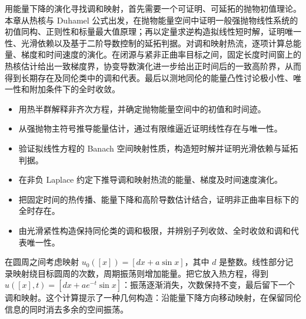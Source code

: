 
% 
% 


\begin{chapterabstract}
	用能量下降的演化寻找调和映射，首先需要一个可证明、可延拓的抛物初值理论。本章从热核与 Duhamel 公式出发，在抛物能量空间中证明一般强抛物线性系统的初值同构、正则性和标量最大值原理；再以定量求逆构造拟线性短时解，证明唯一性、光滑依赖以及基于二阶导数控制的延拓判据。对调和映射热流，逐项计算总能量、梯度和时间速度的演化。在闭源与紧非正曲率目标之间，固定长度时间窗上的热核估计给出一致梯度界，协变导数演化进一步给出正时间后的一致高阶界，从而得到长期存在及同伦类中的调和代表。最后以测地同伦的能量凸性讨论极小性、唯一性和附加条件下的全时收敛。
\end{chapterabstract}

\begin{learninggoals}
	\begin{itemize}
		\item 用热半群解释非齐次方程，并确定抛物能量空间中的初值和时间迹。
		\item 从强抛物主符号推导能量估计，通过有限维逼近证明线性存在与唯一性。
		\item 验证拟线性方程的 Banach 空间映射性质，构造短时解并证明光滑依赖与延拓判据。
		\item 在非负 Laplace 约定下推导调和映射热流的能量、梯度及时间速度演化。
		\item 把固定时间的热传播、能量下降和高阶导数估计结合，证明非正曲率目标下的全时存在。
		\item 由光滑紧性构造保持同伦类的调和极限，并辨别子列收敛、全时收敛和调和代表唯一性。
	\end{itemize}
\end{learninggoals}

在圆周之间考虑映射 \(u_0([x])=[dx+a\sin x]\)，其中 \(d\) 是整数。线性部分记录映射绕目标圆周的次数，周期振荡则增加能量。把它放入热方程，得到 \(u([x],t)=[dx+a e^{-t}\sin x]\)：振荡逐渐消失，次数保持不变，最后留下一个调和映射。这个计算提示了一种几何构造：沿能量下降方向移动映射，在保留同伦信息的同时消去多余的空间振荡。

